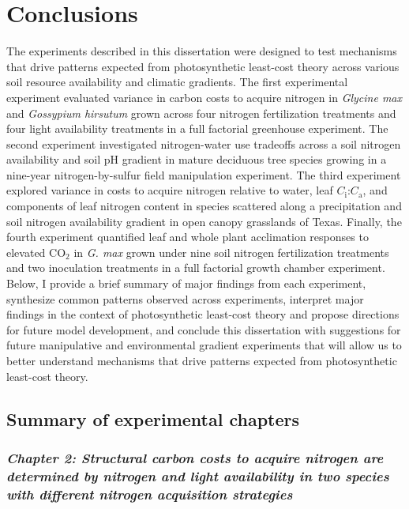 \chapter{\textbf{Conclusions}}
\noindent The experiments described in this dissertation were designed to test mechanisms that drive patterns expected from photosynthetic least-cost theory across various soil resource availability and climatic gradients. The first experimental experiment evaluated variance in carbon costs to acquire nitrogen in \textit{Glycine max} and \textit{Gossypium hirsutum} grown across four nitrogen fertilization treatments and four light availability treatments in a full factorial greenhouse experiment. The second experiment investigated nitrogen-water use tradeoffs across a soil nitrogen availability and soil pH gradient in mature deciduous tree species growing in a nine-year nitrogen-by-sulfur field manipulation experiment. The third experiment explored variance in costs to acquire nitrogen relative to water, leaf $C_\mathrm{i}$:$C_\mathrm{a}$, and components of leaf nitrogen content in species scattered along a precipitation and soil nitrogen availability gradient in open canopy grasslands of Texas. Finally, the fourth experiment quantified leaf and whole plant acclimation responses to elevated CO$_2$ in \textit{G. max} grown under nine soil nitrogen fertilization treatments and two inoculation treatments in a full factorial growth chamber experiment. Below, I provide a brief summary of major findings from each experiment, synthesize common patterns observed across experiments, interpret major findings in the context of photosynthetic least-cost theory and propose directions for future model development, and conclude this dissertation with suggestions for future manipulative and environmental gradient experiments that will allow us to better understand mechanisms that drive patterns expected from photosynthetic least-cost theory.

\section{Summary of experimental chapters}
\begin{singlespace}
    \subsection{\textit{Chapter 2: Structural carbon costs to acquire nitrogen are determined by nitrogen and light availability in two species with different nitrogen acquisition strategies}}   
\end{singlespace}

